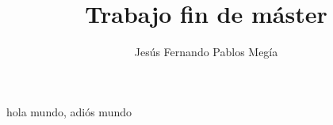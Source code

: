 \documentclass[10pt,a4paper]{book}
\author{Jesús Fernando Pablos Megía}
\title{Trabajo fin de máster}
\begin{document}
hola mundo, adiós mundo
\end{document}
